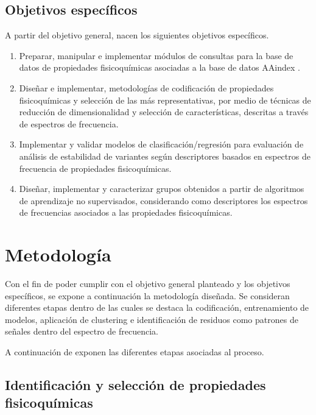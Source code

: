 \subsection{Objetivos específicos}

A partir del objetivo general, nacen los siguientes objetivos específicos.

\begin{enumerate}
	
	\item Preparar, manipular e implementar módulos de consultas para la base de datos de propiedades fisicoquímicas asociadas a la base de datos AAindex \cite{Kawashima2000}.
	
	\item Diseñar e implementar, metodologías de codificación de propiedades fisicoquímicas y selección de las más representativas, por medio de técnicas de reducción de dimensionalidad y selección de características, descritas a través de espectros de frecuencia.
	
	\item Implementar y validar modelos de clasificación/regresión para evaluación de análisis de estabilidad de variantes según descriptores basados en espectros de frecuencia de propiedades fisicoquímicas.
		
	\item Diseñar, implementar y caracterizar grupos obtenidos a partir de algoritmos de aprendizaje no supervisados, considerando como descriptores los espectros de frecuencias asociados a las propiedades fisicoquímicas.
	
\end{enumerate}

\section{Metodología}

Con el fin de poder cumplir con el objetivo general planteado y los objetivos específicos, se expone a continuación la metodología diseñada. Se consideran diferentes etapas dentro de las cuales se destaca la codificación, entrenamiento de modelos, aplicación de clustering e identificación de residuos como patrones de señales dentro del espectro de frecuencia.

A continuación de exponen las diferentes etapas asociadas al proceso.

\subsection{Identificación y selección de propiedades fisicoquímicas}

